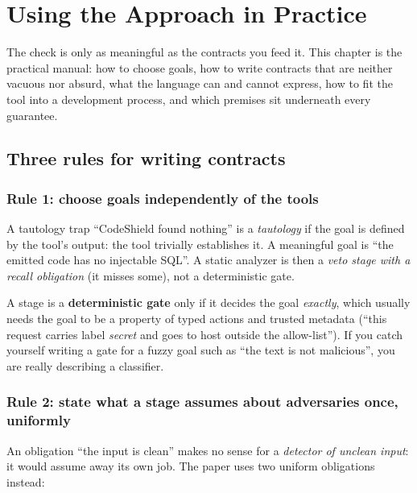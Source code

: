 \section{Using the Approach in Practice}
\label{ch:practice}

\begin{bigidea}
The check is only as meaningful as the contracts you feed it. This chapter is the practical manual: how to choose goals, how to write contracts that are neither vacuous nor absurd, what the language can and cannot express, how to fit the tool into a development process, and which premises sit underneath every guarantee.
\end{bigidea}

\subsection{Three rules for writing contracts}

\subsubsection{Rule 1: choose goals independently of the tools}

\begin{warning}{A tautology trap}
``CodeShield found nothing'' is a \emph{tautology} if the goal is defined by the tool's output: the tool trivially establishes it. A meaningful goal is ``the emitted code has no injectable SQL''. A static analyzer is then a \emph{veto stage with a recall obligation} (it misses some), not a deterministic gate.
\end{warning}

A stage is a \textbf{deterministic gate} only if it decides the goal \emph{exactly}, which usually needs the goal to be a property of typed actions and trusted metadata (``this request carries label \emph{secret} and goes to host outside the allow-list''). If you catch yourself writing a gate for a fuzzy goal such as ``the text is not malicious'', you are really describing a classifier.

\subsubsection{Rule 2: state what a stage assumes about adversaries once, uniformly}

An obligation ``the input is clean'' makes no sense for a \emph{detector of unclean input}: it would assume away its own job. The paper uses two uniform obligations instead:

